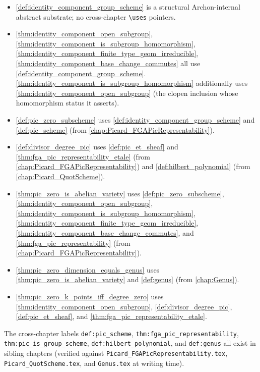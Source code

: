 \begin{itemize}
  \item \cref{def:identity_component_group_scheme} is a structural
    Archon-internal abstract substrate; no cross-chapter
    \texttt{\textbackslash uses} pointers.
  \item \cref{thm:identity_component_open_subgroup},
    \cref{thm:identity_component_is_subgroup_homomorphism},
    \cref{thm:identity_component_finite_type_geom_irreducible},
    \cref{thm:identity_component_base_change_commutes} all use
    \cref{def:identity_component_group_scheme}.
    \cref{thm:identity_component_is_subgroup_homomorphism} additionally
    uses \cref{thm:identity_component_open_subgroup} (the clopen
    inclusion whose homomorphism status it asserts).
  \item \cref{def:pic_zero_subscheme} uses
    \cref{def:identity_component_group_scheme} and
    \cref{def:pic_scheme} (from
    \cref{chap:Picard_FGAPicRepresentability}).
  \item \cref{def:divisor_degree_pic} uses \cref{def:pic_et_sheaf} and
    \cref{thm:fga_pic_representability_etale} (from
    \cref{chap:Picard_FGAPicRepresentability}) and
    \cref{def:hilbert_polynomial} (from \cref{chap:Picard_QuotScheme}).
  \item \cref{thm:pic_zero_is_abelian_variety} uses
    \cref{def:pic_zero_subscheme},
    \cref{thm:identity_component_open_subgroup},
    \cref{thm:identity_component_is_subgroup_homomorphism},
    \cref{thm:identity_component_finite_type_geom_irreducible},
    \cref{thm:identity_component_base_change_commutes}, and
    \cref{thm:fga_pic_representability} (from
    \cref{chap:Picard_FGAPicRepresentability}).
  \item \cref{thm:pic_zero_dimension_equals_genus} uses
    \cref{thm:pic_zero_is_abelian_variety} and
    \cref{def:genus} (from \cref{chap:Genus}).
  \item \cref{thm:pic_zero_k_points_iff_degree_zero} uses
    \cref{thm:identity_component_open_subgroup},
    \cref{def:divisor_degree_pic}, \cref{def:pic_et_sheaf}, and
    \cref{thm:fga_pic_representability_etale}.
\end{itemize}

The cross-chapter labels \texttt{def:pic\_scheme},
\texttt{thm:fga\_pic\_representability},
\texttt{thm:pic\_is\_group\_scheme},
\texttt{def:hilbert\_polynomial}, and \texttt{def:genus} all exist in
sibling chapters (verified against
\texttt{Picard\_FGAPicRepresentability.tex},
\texttt{Picard\_QuotScheme.tex}, and \texttt{Genus.tex} at writing
time).
